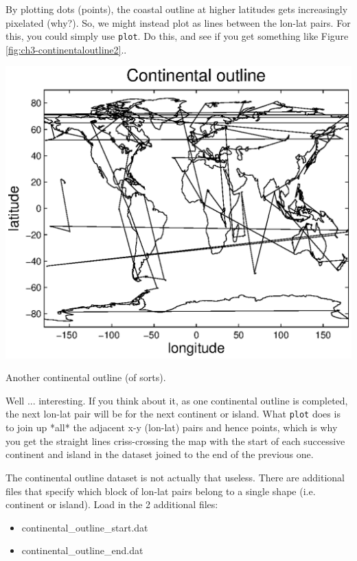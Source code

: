\documentclass{tufte-book} %
\begin{document}
By plotting dots (points), the coastal outline at higher latitudes gets increasingly pixelated (why?). So, we might instead plot as lines between the lon-lat pairs. For this, you could simply use \texttt{plot}. Do this, and see if you get something like Figure \ref{fig:ch3-continentaloutline2}.. 
\begin{marginfigure}[0.0in]
\includegraphics[width=\linewidth]{ch3-continentaloutline2.eps}
\caption{Another continental outline (of sorts).}
\label{fig:ch3-continentaloutline2}
\end{marginfigure}

Well ... interesting. If you think about it, as one continental outline is completed, the next lon-lat pair will be for the next continent or island. What \texttt{plot} does is to join up *all* the adjacent x-y (lon-lat) pairs and hence points, which is why you get the straight lines criss-crossing the map with  the start of each successive continent and island in the dataset joined to the end of the previous one.

The continental outline dataset is not actually that useless. There are  additional files that specify which block of lon-lat pairs belong to a single shape (i.e. continent or island). Load in the 2 additional files:

\begin{itemize}[noitemsep]
\setlength{\itemindent}{.2in}
\item \textsf{continental\_outline\_start.dat}
\item \textsf{continental\_outline\_end.dat}
\end{itemize}
\end{document}
